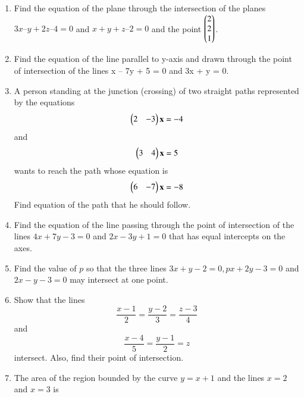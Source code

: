 \begin{enumerate}[label=\thesubsection.\arabic*, ref=\thesubsection.\theenumi]
	\item  Find the equation of the plane through the intersection of the planes $3{x} – {y} + 2{z} – 4 = 0 $ and $ {x} + {y} + {z} – 2 = 0$ and the point $\begin{pmatrix}2\\2\\1\end{pmatrix}$.
		\label{prob:12/11/3/9/plane}
		\\
    \solution
		
	\item  Find the equation of the line parallel to y-axis and drawn through the point of
intersection of the lines x – 7y + 5 = 0 and 3x + y = 0.
\\
\solution
		
    \item A person standing at the junction (crossing) of two straight paths 
    represented by the equations 
    \begin{align}
        \begin{pmatrix}2&-3\end{pmatrix}\mathbf{x} = -4 
        \label{eq:chapters/11/10/4/24/L1}
    \end{align}
    and
    \begin{align}
        \begin{pmatrix}3&4\end{pmatrix}\mathbf{x} = 5
        \label{eq:chapters/11/10/4/24/L2}
    \end{align} 
    wants to reach the path whose equation is 
    \begin{align}
        \begin{pmatrix}6&-7\end{pmatrix}\mathbf{x} = -8
        \label{eq:chapters/11/10/4/24/L3}
    \end{align}
    Find equation of the path that he should follow.
\\
    \solution 
		
	\item Find the equation of the line passing through the point of intersection of the lines $4x + 7y - 3 = 0$ and $2x - 3y + 1 = 0$ that has equal intercepts on the axes.\\
	\solution 
	  
\item
Find the value of $p$ so that the three lines $3x+y-2=0,  px+2y-3=0$ and $2x-y-3=0$ may intersect at one point.
\label{11.10.4.9}
\\
\solution

\item Show that the lines
$$\frac{x-1}{2}=\frac{y-2}{3}=\frac{z-3}{4}$$
 and 
$$ \frac{x-4}{5}=\frac{y-1}{2}=z  $$
 intersect.
 Also,  find their point of intersection.
\item The area of the region bounded by the curve $y = x + 1$ and the lines $x = 2$ and $x = 3$ is

\end{enumerate}
